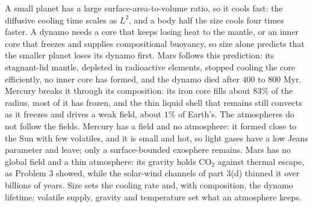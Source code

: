 \begin{solution}
A small planet has a large surface-area-to-volume ratio, so it cools fast: the diffusive cooling time scales as $L^2$, and a body half the size cools four times faster.
A dynamo needs a core that keeps losing heat to the mantle, or an inner core that freezes and supplies compositional buoyancy, so size alone predicts that the smaller planet loses its dynamo first.
Mars follows this prediction: its stagnant-lid mantle, depleted in radioactive elements, stopped cooling the core efficiently, no inner core has formed, and the dynamo died after $400$ to $800$ Myr.
Mercury breaks it through its composition: its iron core fills about $83\%$ of the radius, most of it has frozen, and the thin liquid shell that remains still convects as it freezes and drives a weak field, about $1\%$ of Earth's.
The atmospheres do not follow the fields.
Mercury has a field and no atmosphere: it formed close to the Sun with few volatiles, and it is small and hot, so light gases have a low Jeans parameter and leave; only a surface-bounded exosphere remains.
Mars has no global field and a thin atmosphere: its gravity holds $\mathrm{CO_2}$ against thermal escape, as Problem 3 showed, while the solar-wind channels of part 3(d) thinned it over billions of years.
Size sets the cooling rate and, with composition, the dynamo lifetime; volatile supply, gravity and temperature set what an atmosphere keeps.
\end{solution}
